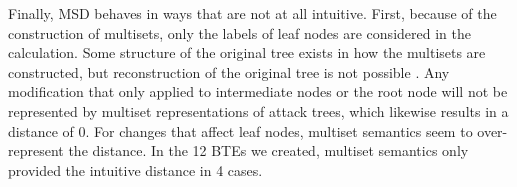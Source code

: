 Finally, MSD behaves in ways that are not at all intuitive. First, because of the construction of multisets, only the labels of leaf nodes are considered in the calculation. Some structure of the original tree exists in how the multisets are constructed, but reconstruction of the original tree is not possible \cite{mauw_foundations_2006}. Any modification that only applied to intermediate nodes or the root node will not be represented by multiset representations of attack trees, which likewise results in a distance of 0. For changes that affect leaf nodes, multiset semantics seem to over-represent the distance. In the 12 BTEs we created, multiset semantics only provided the intuitive distance in 4 cases.




\newcommand{\ReqFootOne}{3}
\newcommand{\ReqFootTwo}{4}
\newcommand{\ReqFootThree}{5}
\newcommand{\ReqTableRow}[9]{#1 & #2 & #3 & #4 & #5 & #6 & #7 & #8 & #9}
